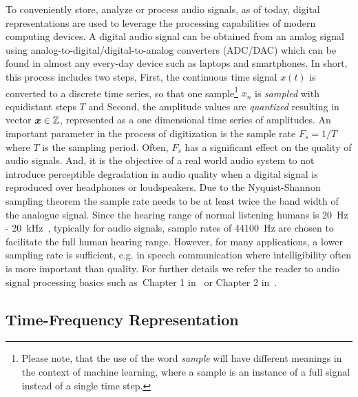 To conveniently store, analyze or process audio signals, as of today, digital representations are used to leverage the processing capabilities of modern computing devices.
A digital audio signal can be obtained from an analog signal using analog-to-digital/digital-to-analog converters (ADC/DAC) which can be found in almost any every-day device such as laptops and smartphones.
In short, this process includes two steps, First, the continuous time signal \(x(t)\) is converted to a discrete time series, so that one sample\footnote{Please note, that the use of the word \emph{sample} will have different meanings in the context of machine learning, where a sample is an instance of a full signal instead of a single time step.} \(x_n\) is \emph{sampled} with equidistant steps \(T\) and Second, the amplitude values are \emph{quantized} resulting in vector \({\bm{x}} \in {\mathbb{Z}}\), represented as a one dimensional time series of amplitudes.
An important parameter in the process of digitization is the sample rate \(F_s = 1/T\) where \(T\) is the sampling period.
Often, \(F_s\) has a significant effect on the quality of audio signals.
And, it is the objective of a real world audio system to not introduce perceptible degradation in audio quality when a digital signal is reproduced over headphones or loudspeakers.
Due to the Nyquist-Shannon sampling theorem the sample rate needs to be at least twice the band width of the analogue signal.
Since the hearing range of normal listening humans is
20~\si{\hertz} - 20~\si{\kilo\hertz}~\cite{fastl90, moore89}, typically for audio signals, 
sample rates of 44100~\si{\hertz} are chosen to facilitate the full human hearing range.
However, for many applications, a lower sampling rate is sufficient, e.g. in speech communication where intelligibility often is more important than quality.
For further details we refer the reader to audio signal processing basics such as~Chapter 1 in~\cite{proakis96} or Chapter 2 in~\cite{Mueller15}.

\hypertarget{time-frequency-representation}{%
\subsection{Time-Frequency Representation}\label{time-frequency-representation}}

